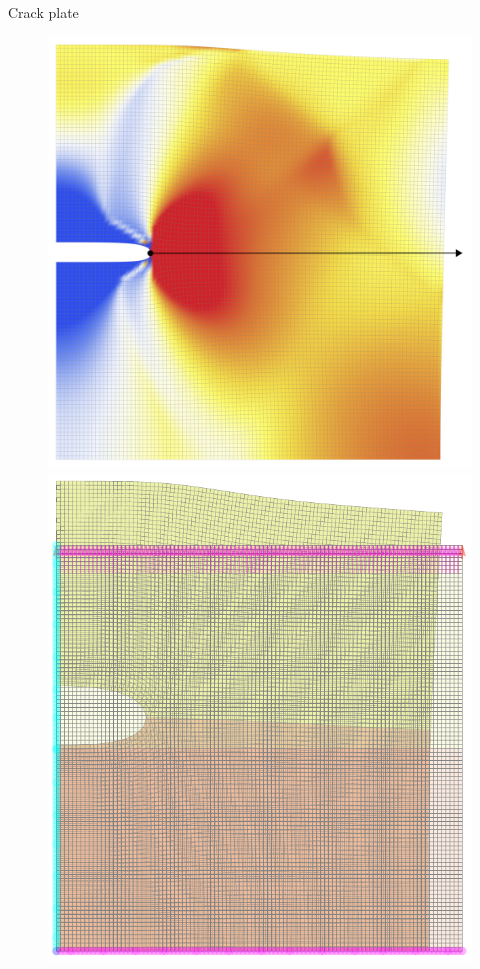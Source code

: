 \documentclass[aspectratio=169,xcolor=dvipsnames]{beamer}
\begin{document}
\begin{frame}{Crack plate}
	
	\begin{figure}
		\begin{minipage}{\linewidth}
			\begin{minipage}[c]{0.3\linewidth}
\includegraphics[width=\linewidth]{plate_def.png}
			\end{minipage}\hfill
		\begin{minipage}{0.65\linewidth}
		\begin{minipage}[b]{0.3\linewidth}
		\includegraphics[width=\linewidth]{plate_175_1145.pdf}

\end{minipage}
\end{minipage}
\end{minipage}
\end{figure}
\end{frame}
\end{document}
